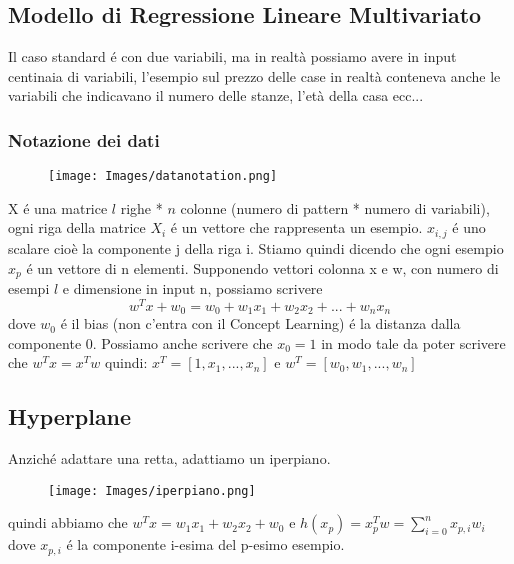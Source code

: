 \documentclass{article}
\begin{document}
\subsection{Modello di Regressione Lineare Multivariato}
Il caso standard é con due variabili, ma in realtà possiamo avere in input centinaia di variabili, l'esempio sul prezzo delle case in realtà conteneva anche le variabili che indicavano il numero delle stanze, l'età della casa ecc... 
\subsubsection{Notazione dei dati}
\begin{figure}[H]
    \centering
    \texttt{[image: Images/datanotation.png]}
\end{figure}
X é una matrice $l$ righe * $n$ colonne (numero di pattern * numero di variabili), ogni riga della matrice $X_i$ é un vettore che rappresenta un esempio. $x_{i,j}$ é uno scalare cioè la componente j della riga i. \newline
Stiamo quindi dicendo che ogni esempio $x_p$ é un vettore di n elementi. \newline
Supponendo vettori colonna x e w, con numero di esempi $l$ e dimensione in input n, possiamo scrivere 
\begin{equation}
    w^Tx+w_0 = w_0+w_1x_1+w_2x_2+...+w_nx_n
\end{equation} 
dove $w_0$ é il bias (non c'entra con il Concept Learning) é la distanza dalla componente 0. Possiamo anche scrivere che $x_0=1$ in modo tale da poter scrivere che $w^Tx = x^Tw$ quindi: $x^T = [1,x_1,...,x_n]$ e $w^T = [w_0, w_1, ..., w_n]$
\clearpage

\subsection{Hyperplane}
Anziché adattare una retta, adattiamo un iperpiano. 
\begin{figure}[H]
    \centering
    \texttt{[image: Images/iperpiano.png]}
\end{figure}
quindi abbiamo che $w^Tx = w_1x_1 + w_2x_2 + w_0$ e $h(x_p) = x_p^Tw=\sum_{i = 0}^n x_{p,i} w_i$
dove $x_{p,i}$ é la componente i-esima del p-esimo esempio.
\end{document}
